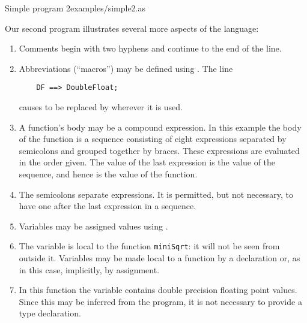 {}
{Simple program 2}{examples/simple2.as}

Our second program 
illustrates several more aspects of the language:

\begin{enumerate}
\item Comments begin with two hyphens \ttin{--} and continue to
      the end of the line.
\item Abbreviations (``macros'') may be defined using \ttin{==>}.
\keywordIndex{==>}
    The line

\begin{verbatim}
    DF ==> DoubleFloat;
\end{verbatim}

    causes  to be replaced by  wherever it is used.

\item A function's body may be a compound expression.  In this example
      the body of the function is a sequence consisting of eight
      expressions separated by semicolons and grouped together by braces.
      These expressions are evaluated in the order given.
      The  value of the last expression is the value of the sequence,
      and hence is the value of the function.

\item The semicolons separate expressions.  It is permitted, but not
      necessary, to have one after the last expression in a sequence.

\item Variables may be assigned values using \ttin{:=}.
\keywordIndex{:=}

\item The variable  is local to the function
      \verb"miniSqrt": it will not be seen from outside it.
      Variables may be made local to a function by a 
      declaration or, as in this case, implicitly, by assignment.

\item In this function the variable 
      contains double precision floating point values.
      Since this may be inferred from the program,
      it is not necessary to provide a type declaration.
\end{enumerate}

